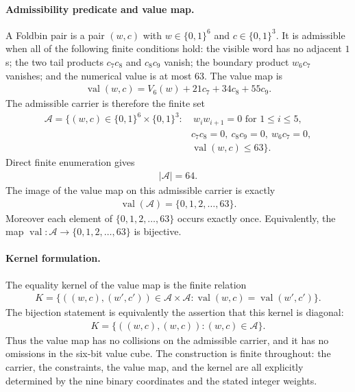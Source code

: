 \paragraph{Admissibility predicate and value map.}
A Foldbin pair is a pair $(w,c)$ with $w\in\{0,1\}^6$ and $c\in\{0,1\}^3$. It is admissible when all of the following finite conditions hold: the visible word has no adjacent $1$s; the two tail products $c_7c_8$ and $c_8c_9$ vanish; the boundary product $w_6c_7$ vanishes; and the numerical value is at most $63$. The value map is
$$
\begin{aligned}
\operatorname{val}(w,c)=V_6(w)+21c_7+34c_8+55c_9.
\end{aligned}
$$
The admissible carrier is therefore the finite set
$$
\begin{aligned}
\mathcal{A}=\{(w,c)\in\{0,1\}^6\times\{0,1\}^3 :&\ w_iw_{i+1}=0\text{ for }1\leq i\leq 5,\\
& c_7c_8=0,\ c_8c_9=0,\ w_6c_7=0,\\
& \operatorname{val}(w,c)\leq 63\}.
\end{aligned}
$$
Direct finite enumeration gives
$$
\begin{aligned}
|\mathcal{A}|=64.
\end{aligned}
$$
The image of the value map on this admissible carrier is exactly
$$
\begin{aligned}
\operatorname{val}(\mathcal{A})=\{0,1,2,\ldots,63\}.
\end{aligned}
$$
Moreover each element of $\{0,1,2,\ldots,63\}$ occurs exactly once. Equivalently, the map $\operatorname{val}:\mathcal{A}\to\{0,1,2,\ldots,63\}$ is bijective.

\paragraph{Kernel formulation.}
The equality kernel of the value map is the finite relation
$$
\begin{aligned}
K=\{((w,c),(w',c'))\in\mathcal{A}\times\mathcal{A}:\operatorname{val}(w,c)=\operatorname{val}(w',c')\}.
\end{aligned}
$$
The bijection statement is equivalently the assertion that this kernel is diagonal:
$$
\begin{aligned}
K=\{((w,c),(w,c)):(w,c)\in\mathcal{A}\}.
\end{aligned}
$$
Thus the value map has no collisions on the admissible carrier, and it has no omissions in the six-bit value cube. The construction is finite throughout: the carrier, the constraints, the value map, and the kernel are all explicitly determined by the nine binary coordinates and the stated integer weights.

